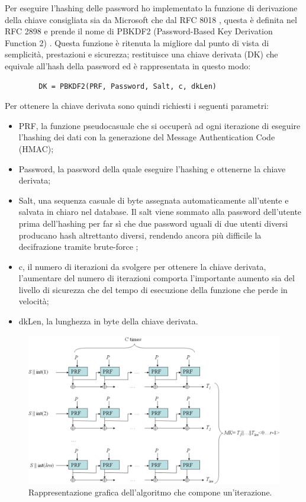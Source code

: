 Per eseguire l'hashing delle password ho implementato la funzione di derivazione della chiave consigliata sia da Microsoft \cite{HashingASPNET} che dal RFC 8018 \cite{RFC8018}, questa è definita nel RFC 2898 \cite{RFC2898} e prende il nome di PBKDF2 (Password-Based Key Derivation Function 2) \cite{PBKDF2}. Questa funzione è ritenuta la migliore dal punto di vista di semplicità, prestazioni e sicurezza; restituisce una chiave derivata (DK) che equivale all'hash della password ed è rappresentata in questo modo:

\begin{center}
    \begin{lstlisting}
        DK = PBKDF2(PRF, Password, Salt, c, dkLen) 
    \end{lstlisting}
\end{center}
\clearpage

Per ottenere la chiave derivata sono quindi richiesti i seguenti parametri: 
\begin{itemize}
    \item PRF, la funzione pseudocasuale che si occuperà ad ogni iterazione di eseguire l'hashing dei dati con la generazione del Message Authentication Code (HMAC);
    \item Password, la password della quale eseguire l'hashing e ottenerne la chiave derivata;
    \item Salt, una sequenza casuale di byte assegnata automaticamente all'utente e salvata in chiaro nel database. Il salt viene sommato alla password dell'utente prima dell'hashing per far sì che due password uguali di due utenti diversi producano hash altrettanto diversi, rendendo ancora più difficile la decifrazione tramite brute-force \cite{Salt};
    \item c, il numero di iterazioni da svolgere per ottenere la chiave derivata, l'aumentare del numero di iterazioni comporta l'importante aumento sia del livello di sicurezza che del tempo di esecuzione della funzione che perde in velocità;
    \item dkLen, la lunghezza in byte della chiave derivata.
\end{itemize}
\medskip

\begin{figure}[ht]
    \centering\includegraphics[scale=0.44]{images/Pbkdf2.png}
    \caption{Rappresentazione grafica dell'algoritmo che compone un'iterazione.}
\end{figure}


